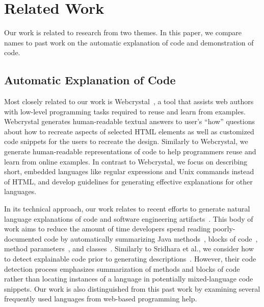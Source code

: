 \section{Related Work}

Our work is related to research from two themes.
In this paper, we compare \Glspl{name} to past work on the automatic explanation of code and demonstration of code.

\subsection{Automatic Explanation of Code}

Most closely related to our work is Webcrystal~\cite{chang_webcrystal_2012}, a tool that assists web authors with low-level programming tasks required to reuse and learn from examples.  
Webcrystal generates human-readable textual answers to user's ``how'' questions about how to recreate aspects of selected HTML elements as well as customized code snippets for the users to recreate the design.
Similarly to Webcrystal, we generate human-readable representations of code to help programmers reuse and learn from online examples.
In contrast to Webcrystal, we focus on describing short, embedded languages like regular expressions and Unix commands instead of HTML, and develop guidelines for generating effective explanations for other languages.

In its technical approach, our work relates to recent efforts to generate natural language explanations of code and software engineering artifacts~\cite{sridhara_automatically_2011,burden_natural_2011,sridhara_towards_2010,kamimura_towards_2013,mcburney_automatic_2014,sridhara_generating_2011,haiduc_supporting_2010,moreno_automatic_2013}.
This body of work aims to reduce the amount of time developers spend reading poorly-documented code by automatically summarizing Java methods~\cite{sridhara_towards_2010}, blocks of code~\cite{sridhara_automatically_2011}, method parameters~\cite{sridhara_generating_2011}, and classes~\cite{moreno_automatic_2013}.
Similarly to Sridhara et al., we consider how to detect explainable code prior to generating descriptions~\cite{sridhara_automatically_2011,sridhara_towards_2010}.
However, their code detection process emphasizes summarization of methods and blocks of code rather than locating instances of a language in potentially mixed-language code snippets.
Our work is also distinguished from this past work by examining several frequently used languages from web-based programming help.

